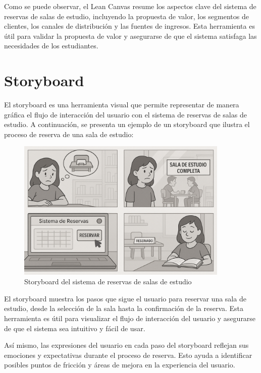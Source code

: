 \documentclass{article}
\begin{document}
      Como se puede observar, el Lean Canvas resume los aspectos clave del sistema de reservas de salas de estudio, incluyendo la propuesta de valor, los segmentos de clientes, los canales de distribución y las fuentes de ingresos. Esta herramienta es útil para validar la propuesta de valor y asegurarse de que el sistema satisfaga las necesidades de los estudiantes.


      \newpage

      \section{Storyboard}

      El storyboard es una herramienta visual que permite representar de manera gráfica el flujo de interacción del usuario con el sistema de reservas de salas de estudio. A continuación, se presenta un ejemplo de un storyboard que ilustra el proceso de reserva de una sala de estudio:

      \begin{figure}[ht]
        \centering
        \includegraphics[width=0.9\textwidth]{assets/storyboard.png}
        \caption{Storyboard del sistema de reservas de salas
        de estudio}
        \label{fig:Storyboard}
      \end{figure}
  
      El storyboard muestra los pasos que sigue el usuario para reservar una sala de estudio, desde la selección de la sala hasta la confirmación de la reserva. Esta herramienta es útil para visualizar el flujo de interacción del usuario y asegurarse de que el sistema sea intuitivo y fácil de usar.

      Así mismo, las expresiones del usuario en cada paso del storyboard reflejan sus emociones y expectativas durante el proceso de reserva. Esto ayuda a identificar posibles puntos de fricción y áreas de mejora en la experiencia del usuario.
      \newpage
\end{document}
